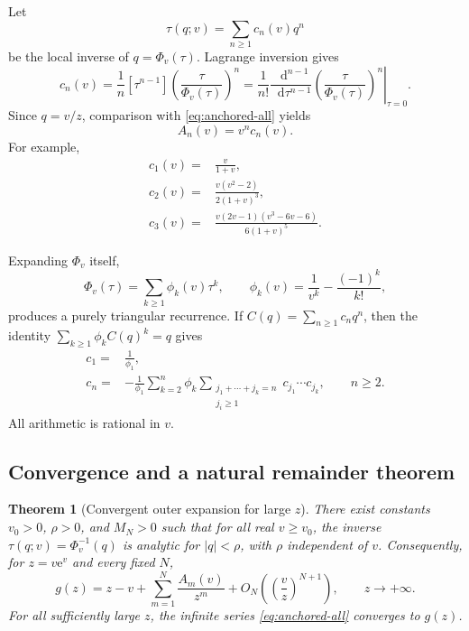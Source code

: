\documentclass[11pt,oneside]{article}
\theoremstyle{plain}
\newtheorem{theorem}{Theorem}[section]
\theoremstyle{definition}
\theoremstyle{remark}
\newcommand{\e}{\mathrm{e}}
\newcommand{\dd}{\mathop{}\!\mathrm{d}}
\begin{document}
Let
\begin{equation}
 \tau(q;v)=\sum_{n\ge1}c_n(v)q^n
 \label{eq:tau-c-series}
\end{equation}
be the local inverse of \(q=\Phi_v(\tau)\).  Lagrange inversion gives
\begin{equation}
 \boxed{
 c_n(v)=\frac1n[\tau^{n-1}]
 \left(\frac{\tau}{\Phi_v(\tau)}\right)^n
 =\frac1{n!}\left.
 \frac{\dd^{n-1}}{\dd\tau^{n-1}}
 \left(\frac{\tau}{\Phi_v(\tau)}\right)^n
 \right|_{\tau=0}.}
 \label{eq:cn-Lagrange}
\end{equation}
Since \(q=v/z\), comparison with \eqref{eq:anchored-all} yields
\begin{equation}
 A_n(v)=v^n c_n(v).
 \label{eq:An-cn}
\end{equation}
For example,
\begin{align}
 c_1(v)={}&\frac{v}{1+v},\label{eq:c1}\\
 c_2(v)={}&\frac{v(v^2-2)}{2(1+v)^3},\label{eq:c2}\\
 c_3(v)={}&\frac{v(2v-1)(v^3-6v-6)}{6(1+v)^5}.
 \label{eq:c3}
\end{align}

Expanding \(\Phi_v\) itself,
\begin{equation}
 \Phi_v(\tau)=\sum_{k\ge1}\phi_k(v)\tau^k,
 \qquad
 \phi_k(v)=\frac1{v^k}-\frac{(-1)^k}{k!},
 \label{eq:phi-k}
\end{equation}
produces a purely triangular recurrence.  If
\(C(q)=\sum_{n\ge1}c_nq^n\), then the identity
\(\sum_{k\ge1}\phi_k C(q)^k=q\) gives
\begin{align}
 c_1={}&\frac1{\phi_1},
 \label{eq:cn-rec-first}\\
 c_n={}&-\frac1{\phi_1}
 \sum_{k=2}^{n}\phi_k
 \sum_{\substack{j_1+\cdots+j_k=n\\j_i\ge1}}
 c_{j_1}\cdots c_{j_k},
 \qquad n\ge2.
 \label{eq:cn-rec}
\end{align}
All arithmetic is rational in \(v\).

\subsection{Convergence and a natural remainder theorem}

\begin{theorem}[Convergent outer expansion for large \(z\)]
\label{thm:q-convergence}
There exist constants \(v_0>0\), \(\rho>0\), and \(M_N>0\) such that for all
real \(v\ge v_0\), the inverse \(\tau(q;v)=\Phi_v^{-1}(q)\) is analytic for
\(|q|<\rho\), with \(\rho\) independent of \(v\).  Consequently, for
\(z=v\e^v\) and every fixed \(N\),
\begin{equation}
 g(z)=z-v+\sum_{m=1}^{N}\frac{A_m(v)}{z^m}
 +O_N\!\left(\left(\frac{v}{z}\right)^{N+1}\right),
 \qquad z\to+\infty.
 \label{eq:q-remainder}
\end{equation}
For all sufficiently large \(z\), the infinite series
\eqref{eq:anchored-all} converges to \(g(z)\).
\end{theorem}
\end{document}
